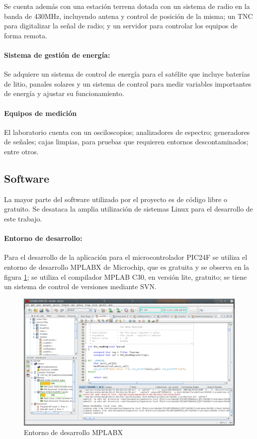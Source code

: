 \documentclass[11pt,letterpaper]{article}
\begin{document}
Se cuenta además con una estación terrena dotada con un sistema de radio en la banda de 430MHz, incluyendo antena y control de posición de la misma; un TNC para digitalizar la señal de radio; y un servidor para controlar los equipos de forma remota.

\paragraph{Sistema de gestión de energía:}
Se adquiere un sistema de control de energía para el satélite que incluye baterías de litio, panales solares y un sistema de control para medir variables importantes de energía y ajustar su funcionamiento.

\paragraph{Equipos de medición}
El laboratorio cuenta con un osciloscopios; analizadores de espectro; generadores de señales; cajas limpias, para pruebas que requieren entornos descontaminados; entre otros.

\subsection{Software}
La mayor parte del software utilizado por el proyecto es de código libre o gratuito. Se desataca la amplia utilización de sistemas Linux para el desarrollo de este trabajo.

\paragraph{Entorno de desarrollo:}
Para el desarrollo de la aplicación para el microcontrolador PIC24F se utiliza el entorno de desarrollo MPLABX de Microchip, que es gratuita y se observa en la figura \ref{mplabx}; se utiliza el compilador MPLAB C30, en versión lite, gratuito; se tiene un sistema de control de versiones mediante SVN.

\begin{figure}[!h] 
\centering \includegraphics[scale=0.4]{img/mplabx.png}
\caption{Entorno de desarrollo MPLABX} \label{mplabx}
\end{figure}
\end{document}
